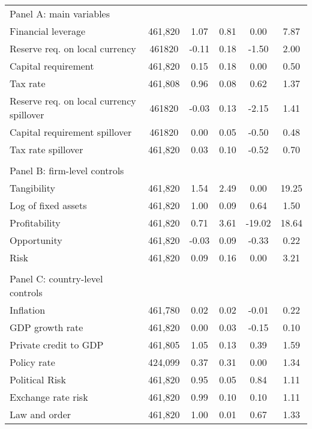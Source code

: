 \begin{longtable}{lccccc}
Panel A: main variables         &      &        &        &        &       \\
\quad Financial leverage  &      461,820&        1.07&        0.81&        0.00&        7.87\\
\quad Reserve req. on local currency&      461820&       -0.11&        0.18&       -1.50&        2.00\\
\quad Capital requirement &      461,820&        0.15&        0.18&        0.00&        0.50\\
\quad Tax rate            &      461,808&        0.96&        0.08&        0.62&        1.37\\
\quad Reserve req. on local currency spillover&      461820&       -0.03&        0.13&       -2.15&        1.41\\
\quad Capital requirement spillover&      461820&        0.00&        0.05&       -0.50&        0.48\\
\quad Tax rate spillover  &      461,820&        0.03&        0.10&       -0.52&        0.70\\
         &      &        &        &        &       \\
Panel B: firm-level controls         &      &        &        &        &       \\
\quad Tangibility         &      461,820&        1.54&        2.49&        0.00&       19.25\\
\quad Log of fixed assets &      461,820&        1.00&        0.09&        0.64&        1.50\\
\quad Profitability       &      461,820&        0.71&        3.61&      -19.02&       18.64\\
\quad Opportunity         &      461,820&       -0.03&        0.09&       -0.33&        0.22\\
\quad Risk                &      461,820&        0.09&        0.16&        0.00&        3.21\\
         &      &        &        &        &       \\
Panel C: country-level controls         &      &        &        &        &       \\
\quad Inflation           &      461,780&        0.02&        0.02&       -0.01&        0.22\\
\quad GDP growth rate     &      461,820&        0.00&        0.03&       -0.15&        0.10\\
\quad Private credit to GDP&      461,805&        1.05&        0.13&        0.39&        1.59\\
\quad Policy rate         &      424,099&        0.37&        0.31&        0.00&        1.34\\
\quad Political Risk      &      461,820&        0.95&        0.05&        0.84&        1.11\\
\quad Exchange rate risk  &      461,820&        0.99&        0.10&        0.10&        1.11\\
\quad Law and order       &      461,820&        1.00&        0.01&        0.67&        1.33\\
\hline
\end{longtable}

